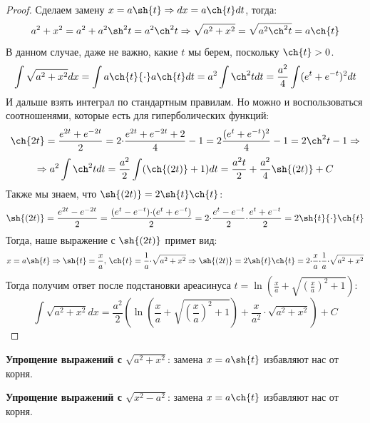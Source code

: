 \documentclass[12pt]{article}
\theoremstyle{definition}
\DeclareMathOperator{\dint}{\displaystyle\int}
\begin{document}
\begin{proof}
	Сделаем замену $x = a \sh{t} \Rightarrow  dx = a\ch{t}dt $, тогда: 
	$$
		a^2 + x^2 = a^2 + a^2\sh^2{t} = a^2\ch^2{t} \Rightarrow \sqrt{a^2 + x^2} = \sqrt{a^2\ch^2{t}} = a\ch{t}
	$$
	В данном случае, даже не важно, какие $t$ мы берем, поскольку $\ch{t} > 0$.
	$$
		 \dint \sqrt{a^2 + x^2} dx = \dint a\ch{t}{\cdot} a \ch{t}dt = a^2\dint \ch^2{t}dt = \dfrac{a^2}{4}\dint (e^t + e^{-t})^2 dt
	$$
	И дальше взять интеграл по стандартным правилам. Но можно и воспользоваться соотношенями, которые есть для гиперболических функций:
	$$
		\ch{2t} = \dfrac{e^{2t} + e^{-2t}}{2} = 2 {\cdot}\dfrac{e^{2t} + e^{-2t} + 2}{4} - 1 = 2\dfrac{(e^t + e^{-t})^2}{4} - 1 = 2\ch^2{t} - 1 \Rightarrow
	$$
	$$
		\Rightarrow a^2\dint \ch^2{t}dt = \dfrac{a^2}{2} \dint (\ch{(2t)} + 1)dt = \dfrac{a^2t}{2} + \dfrac{a^2}{4}\sh{(2t)} + C
	$$
	Также мы знаем, что $\sh{(2t)} = 2\sh{t}\ch{t}$: 
	$$
		\sh{(2t)} = \dfrac{e^{2t} - e^{-2t}}{2} = \dfrac{(e^{t} - e^{-t}){\cdot}(e^t + e^{-t})}{2} = 2{\cdot}\dfrac{e^{t} - e^{-t}}{2}{\cdot}\dfrac{e^{t} + e^{-t}}{2} = 2\sh{t}{\cdot}\ch{t}
	$$
	Тогда, наше выражение с $\sh{(2t)}$ примет вид:
	$$
		x = a\sh{t} \Rightarrow \sh{t} = \dfrac{x}{a}, \, \ch{t} = \dfrac{1}{a}{\cdot}\sqrt{a^2 + x^2} \Rightarrow \sh{(2t)} = 2\sh{t}\ch{t} = 2 {\cdot}\dfrac{x}{a}{\cdot}\dfrac{1}{a}{\cdot}\sqrt{a^2 + x^2}
	$$
	Тогда получим ответ после подстановки ареасинуса $t= \ln{\left(\tfrac{x}{a} + \sqrt{\left(\tfrac{x}{a}\right)^2 + 1}\right)}$:
	$$
		\dint \sqrt{a^2 + x^2} dx =  \dfrac{a^2}{2}\left(\ln{\left(\dfrac{x}{a} + \sqrt{\left(\dfrac{x}{a}\right)^2 + 1}\right)} +  \dfrac{x}{a^2}{\cdot}\sqrt{a^2 + x^2}\right) + C
	$$
\end{proof}

\textbf{Упрощение выражений с $\sqrt{a^2 + x^2}$}: замена $x = a\sh{t}$ избавляют нас от корня.

\textbf{Упрощение выражений с $\sqrt{x^2 - a^2}$}: замена $x = a\ch{t}$ избавляют нас от корня.
\end{document}
